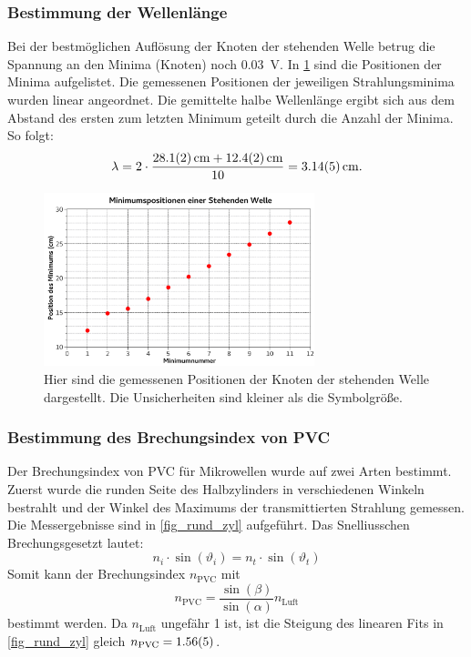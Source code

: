 \documentclass[
	a4paper,
	12pt,
	pagesize,
	ngerman
]{scrartcl}
\begin{document}
	\subsubsection{Bestimmung der Wellenlänge}
	Bei der bestmöglichen Auflösung der Knoten der stehenden Welle betrug die Spannung an den Minima (Knoten) noch \SI{0,03}{V}.
	In \cref{fig_steh_welle} sind die Positionen der Minima aufgelistet.
	Die gemessenen Positionen der jeweiligen Strahlungsminima wurden linear angeordnet. 
	Die gemittelte halbe Wellenlänge ergibt sich aus dem Abstand des ersten zum letzten Minimum geteilt durch die Anzahl der Minima. %
	So folgt: 
	\begin{equation}
		\lambda = 2 \cdot \frac{\SI{28,1 +- 0,2}{cm} + \SI{12,4+-0,2}{cm}}{10} = \SI{3,14 +- 0,05}{cm}.
	\end{equation}
	\begin{figure}[H]
		\includegraphics[width=0.7\textwidth]{fig_steh_welle}
		\centering
		\caption{Hier sind die gemessenen Positionen der Knoten der stehenden Welle dargestellt. Die Unsicherheiten sind kleiner als die Symbolgröße.}
		\label{fig_steh_welle}
		\centering
	\end{figure}
	\subsubsection{Bestimmung des Brechungsindex von PVC}
	Der Brechungsindex von PVC für Mikrowellen wurde auf zwei Arten bestimmt. 
	Zuerst wurde die runden Seite des Halbzylinders in verschiedenen Winkeln bestrahlt und der Winkel des Maximums der transmittierten Strahlung gemessen.
	Die Messergebnisse sind in \cref{fig_rund_zyl} aufgeführt.
	Das Snelliusschen Brechungsgesetzt lautet:
	\begin{equation}
		n_i \cdot \sin(\vartheta_i) = n_t \cdot \sin(\vartheta_t)
		\label{eq_snellius}
	\end{equation}
	Somit kann der Brechungsindex $n_\text{PVC}$  mit 
	\begin{equation}
		n_\text{PVC} = \frac{\sin(\beta)}{\sin(\alpha)} n_\text{Luft}
	\end{equation}
	bestimmt werden.
	Da $n_\text{Luft}$ ungefähr 1 ist, ist die Steigung des linearen Fits in \cref{fig_rund_zyl} gleich $n_\text{PVC}=\SI{1,56 +- 0,05}{}$.
\end{document}
